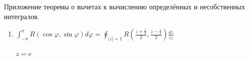 Приложение теоремы о вычетах к вычислению определённых и несобственных интегралов.
\begin{enumerate}
    \item $\int_{-\pi}^{\pi} R(\cos\varphi, \sin\varphi)d\varphi = \oint_{|z| = 1} R\left( \frac{z + \frac{1}{2}}{2}, \frac{z - \frac{1}{2}}{2} \right) \frac{dz}{iz} $

    $z = e$
\end{enumerate}
